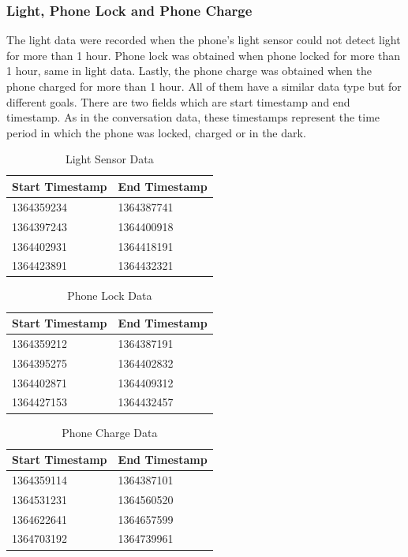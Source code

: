 \documentclass[12pt,oneandhalf,chaparabic,lfm,phd,eng,oneside,pntc]{gsufbe}
\begin{document}
\subsubsection{Light, Phone Lock and Phone Charge}
\label{subsubsec:Light}
The light data were recorded when the phone’s light sensor could not detect light for more than 1 hour. Phone lock was obtained when phone locked for more than 1 hour, same in light data. Lastly, the phone charge was obtained when the phone charged for more than 1 hour. All of them have a similar data type but for different goals. There are two fields which are start timestamp and end timestamp. As in the conversation data, these timestamps represent the time period in which the phone was locked, charged or in the dark. 

\begin{table}[b!]
\centering
\caption{Light Sensor Data}
\label{tab:Light Sensor}
\begin{tabular}{|l|l|}
\hline
Start Timestamp      & End Timestamp    \\ \hline
1364359234 & 1364387741 \\
1364397243 & 1364400918 \\
1364402931 & 1364418191 \\
1364423891 & 1364432321 \\ \hline
\end{tabular}
\end{table}

\begin{table}[b!]
\centering
\caption{Phone Lock Data}
\label{tab:Phone Lock}
\begin{tabular}{|l|l|}
\hline
Start Timestamp      & End Timestamp   \\ \hline
1364359212 & 1364387191 \\
1364395275 & 1364402832 \\
1364402871 & 1364409312 \\
1364427153 & 1364432457 \\ \hline
\end{tabular}
\end{table}

\begin{table}[b!]
\centering
\caption{Phone Charge Data}
\label{tab:Phone Charge}
\begin{tabular}{|l|l|}
\hline
Start Timestamp      & End Timestamp   \\ \hline
1364359114 & 1364387101 \\
1364531231 & 1364560520 \\
1364622641 & 1364657599 \\
1364703192 & 1364739961 \\ \hline
\end{tabular}
\end{table}
\end{document}
